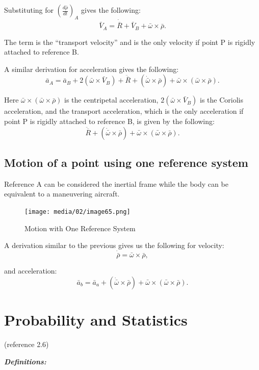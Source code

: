 \documentclass[
]{book}
\begin{document}
Substituting for \(\left( \frac{d \bar{\rho}}{dt} \right)_A\) gives the following:
\[\bar{V}_A  = \dot{\overline{R}} + \bar{V}_B + \bar{\omega} \times \bar{\rho}.\]

The term is the ``transport velocity'' and is the only velocity if point P is rigidly attached to reference B.

A similar derivation for acceleration gives the following:
\[\bar{a}_A = \bar{a}_B + 2(\bar{\omega} \times \bar{V}_B) + \ddot{\overline{R}} + (\dot{\bar{\omega}} \times \bar{\rho}) + \bar{\omega} \times (\bar{\omega} \times \bar{\rho}).\]

Here \(\bar{\omega} \times (\bar{\omega} \times \bar{\rho})\) is the centripetal acceleration, \(2(\bar{\omega} \times \bar{V}_B)\) is the Coriolis acceleration, and the transport acceleration, which is the only acceleration if point P is rigidly attached to reference B, is given by the following:
\[\ddot{\overline{R}} + (\dot{\bar{\omega}} \times \bar{\rho}) + \bar{\omega} \times (\bar{\omega} \times \bar{\rho}).\]

\hypertarget{motion-of-a-point-using-one-reference-system}{%
\subsection{Motion of a point using one reference system}\label{motion-of-a-point-using-one-reference-system}}

Reference A can be considered the inertial frame while the body can be equivalent to a maneuvering aircraft.

\begin{figure}
\centering
\texttt{[image: media/02/image65.png]}
\caption{Motion with One Reference System}
\end{figure}

A derivation similar to the previous gives us the following for
velocity:
\[\dot{\bar{\rho}} = \bar{\omega} \times \bar{\rho},\]

and acceleration:
\[\bar{a}_b = \bar{a}_a + (\dot{\bar{\omega}} \times \bar{\rho}) + \bar{\omega} \times (\bar{\omega} \times \bar{\rho}).\]

\hypertarget{probability-and-statistics}{%
\section{Probability and Statistics}\label{probability-and-statistics}}

(reference 2.6)

\textbf{\emph{Definitions:}}
\end{document}
